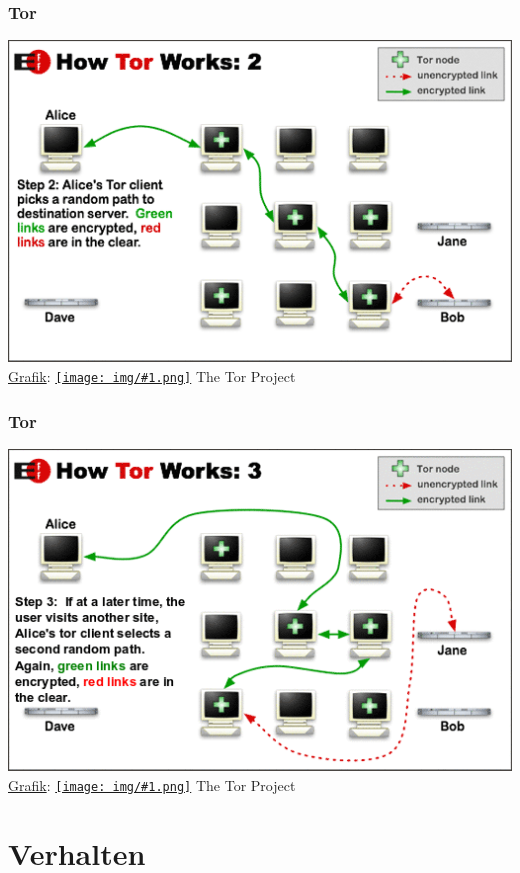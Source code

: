 \documentclass[12pt, xcolor={svgnames,table}]{beamer}
\newcommand{\cc}[1]{\texttt{[image: img/\#1.png]}\hspace{1mm}}
\begin{document}
\begin{frame}
    \frametitle{Tor}
    \includegraphics[height=0.7\textheight]{img/tor2.png}
    \\{\small \href{https://www.torproject.org/images/htw2.png}{Grafik}: \href{https://creativecommons.org/licenses/by/3.0/us/}{\cc{by}} The Tor Project}
\end{frame}

\begin{frame}
    \frametitle{Tor}
    \includegraphics[height=0.7\textheight]{img/tor3.png}
    \\{\small \href{https://www.torproject.org/images/htw3.png}{Grafik}: \href{https://creativecommons.org/licenses/by/3.0/us/}{\cc{by}} The Tor Project}
\end{frame}

\section{Verhalten}
\end{document}

